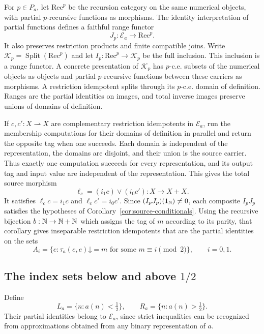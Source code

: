 For $p\in P_a$, let $\mathrm{Rec}^{p}$ be the recursion category on
the same numerical objects, with partial $p$-recursive functions as
morphisms. The identity interpretation of partial functions defines a
faithful range functor
\[
 J_p:\mathcal E_a\longrightarrow\mathrm{Rec}^{p}.
\]
It also preserves restriction products and finite compatible joins.
Write $\mathcal K_p=\operatorname{Split}(\mathrm{Rec}^{p})$ and let
$I_p:\mathrm{Rec}^{p}\to\mathcal K_p$ be the full inclusion.
This inclusion is a range functor.
A concrete presentation of $\mathcal K_p$ has $p$-c.e. subsets of the
numerical objects as objects and partial $p$-recursive functions between
these carriers as morphisms. A restriction idempotent splits through its
$p$-c.e. domain of definition.
Ranges are the partial identities on images, and total inverse
images preserve unions of domains of definition.

If $c,c':X\rightharpoonup X$ are complementary restriction
idempotents in $\mathcal E_a$, run the membership computations for their domains of
definition in parallel and return the opposite tag when one succeeds.
Each domain is independent of the representation, the domains are
disjoint, and their union is the source carrier. Thus exactly one
computation succeeds for every representation, and its output tag and
input value are independent of the representation. This gives the total
source morphism
\[
 \ell_c=(i_1c)\vee(i_0c'):X\longrightarrow X+X.
\]
It satisfies $\ell_cc=i_1c$ and $\ell_cc'=i_0c'$.
Since $(I_pJ_p)(1_{\mathbb N})\ne0$, each composite
$I_pJ_p$ satisfies the hypotheses of Corollary~\ref{cor:source-conditionals}.
Using the recursive bijection $b:\mathbb N\to\mathbb N+\mathbb N$ which assigns the tag
of $m$ according to its parity, that corollary gives inseparable
restriction idempotents that are the partial identities on the sets
\begin{equation}\label{eq:miller-diagonal-pair}
 A_i=\{e:\tau_a(e,e)\mathord\downarrow=m
                   \text{ for some }m\equiv i\pmod2\},
 \qquad i=0,1.
\end{equation}

\subsection{The index sets below and above \texorpdfstring{$1/2$}{1/2}}
\label{sec:miller-cuts}

Define
\[
 L_a=\{n:a(n)<\tfrac12\},\qquad
 R_a=\{n:a(n)>\tfrac12\}.
\]
Their partial identities belong to $\mathcal E_a$, since strict
inequalities can be recognized from approximations obtained from any
binary representation of $a$.

